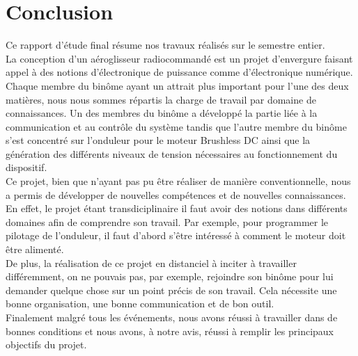 	\chapter{Conclusion}
	
	Ce rapport d'étude final résume nos travaux réalisés sur le semestre entier.\\
	
	La conception d'un aéroglisseur radiocommandé est un projet d'envergure faisant appel à des notions d'électronique de puissance comme d'électronique numérique. Chaque membre du binôme ayant un attrait plus important pour l'une des deux matières, nous nous sommes répartis la charge de travail par domaine de connaissances. Un des membres du binôme a développé la partie liée à la communication et au contrôle du système tandis que l'autre membre du binôme s'est concentré sur l'onduleur pour le moteur Brushless DC ainsi que la génération des différents niveaux de tension nécessaires au fonctionnement du dispositif.\\
	
	Ce projet, bien que n'ayant pas pu être réaliser de manière conventionnelle, nous a permis de développer de nouvelles compétences et de nouvelles connaissances. En effet, le projet étant transdiciplinaire il faut avoir des notions dans différents domaines afin de comprendre son travail. Par exemple, pour programmer le pilotage de l'onduleur, il faut d'abord s'être intéressé à comment le moteur doit être alimenté.\\
	
	De plus, la réalisation de ce projet en distanciel à inciter à travailler différemment, on ne pouvais pas, par exemple, rejoindre son binôme pour lui demander quelque chose sur un point précis de son travail. Cela nécessite une bonne organisation, une bonne communication et de bon outil.\\
	
	Finalement malgré tous les événements, nous avons réussi à travailler dans de bonnes conditions et nous avons, à notre avis, réussi à remplir les principaux objectifs du projet. \\
